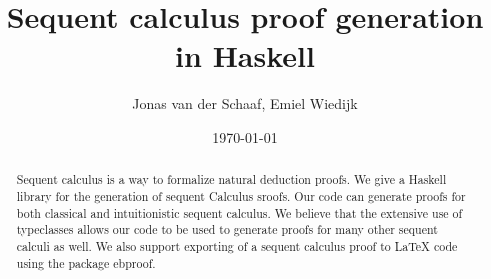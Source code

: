 \documentclass[12pt,a4paper]{article}
\title{Sequent calculus proof generation in Haskell}
\author{Jonas van der Schaaf, Emiel Wiedijk}
\date{\today}
\begin{document}
\maketitle

\begin{abstract}
    Sequent calculus is a way to formalize natural deduction proofs. We give a
    Haskell library for the generation of sequent Calculus sroofs. Our code can
    generate proofs for both classical and intuitionistic sequent calculus. We
    believe that the extensive use of typeclasses allows our code to be used to
    generate proofs for many other sequent calculi as well. We also support
    exporting of a sequent calculus proof to \LaTeX{} code using the package
    ebproof.
\end{abstract}

\newpage
\tableofcontents

\clearpage














\newpage


\newpage

\end{document}

